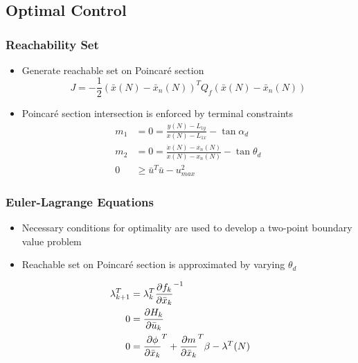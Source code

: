 \section*{}
\subsection*{Optimal Control}
\begin{frame} %
\frametitle{Reachability Set}
  \begin{itemize}
  \item Generate reachable set on Poincar\'e section
  \begin{equation*}
	J = -\frac{1}{2} \left( \bar{x}(N) - \bar{x}_{n}(N)\right)^T 
	Q_f
	\left( \bar{x}(N) - \bar{x}_{n}(N)\right)
	\label{eq:cost}
\end{equation*}
  \item Poincar\'e section intersection is enforced by terminal constraints
 \begin{subequations}
\begin{align*}
	m_1 &= 0 = \frac{y(N) - L_{1y}}{x(N) - L_{1x}} - \tan{\alpha_d} \\ 
    m_2&= 0 = \frac{\dot{x}(N) - \dot{x_n}(N) }{x(N) -x_n(N) } - \tan{\theta_d} \\
	 0 &\geq\bar{u}^T \bar{u} - u_{max}^2 
\end{align*}
    \label{eq:constraints}
\end{subequations}
 \end{itemize}
\end{frame}   %

\begin{frame}%
\frametitle{Euler-Lagrange Equations}
\begin{itemize}
	\item Necessary conditions for optimality are used to develop a two-point boundary value problem
	\item Reachable set on Poincar\'e section is approximated by varying \(\theta_d\)
\end{itemize}
\begin{subequations}\label{eq:necc_cond}
\begin{align*}
	\lambda_{k+1}^T &= \lambda_k^T  \frac{\partial f_k}{\partial \bar{x}_k}^{-1} \\
	0 &=  \frac{\partial H_k}{\partial \bar{u}_k} \\
	0 &= \frac{\partial \phi}{\partial \bar{x}_k}^T + \frac{\partial m}{\partial \bar{x}_k}^T\beta  - \lambda^T(N) 
\end{align*}
\end{subequations}
\end{frame} %